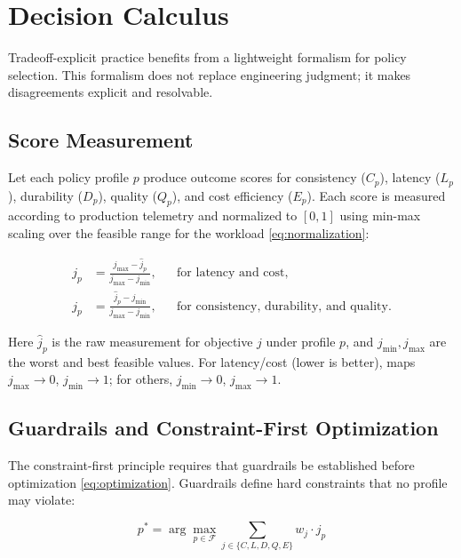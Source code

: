 \documentclass[conference]{IEEEtran}
\begin{document}
{\section{Decision Calculus}
\label{sec:calculus}

Tradeoff-explicit practice benefits from a lightweight formalism for policy selection. This formalism does not replace engineering judgment; it makes disagreements explicit and resolvable.

{\color{red}
\subsection{Score Measurement}

Let each policy profile $p$ produce outcome scores for consistency ($C_p$), latency ($L_p$), durability ($D_p$), quality ($Q_p$), and cost efficiency ($E_p$). Each score is measured according to production telemetry and normalized to $[0, 1]$ using min-max scaling over the feasible range for the workload \eqref{eq:normalization}:

\begin{equation}
\begin{aligned}
j_p &= \frac{j_{\max}-\hat{j}_p}{j_{\max}-j_{\min}},
&& \text{for latency and cost,} \\
j_p &= \frac{\hat{j}_p-j_{\min}}{j_{\max}-j_{\min}},
&& \text{for consistency, durability, and quality.}
\end{aligned}
\label{eq:normalization}
\end{equation}

Here $\hat{j}_p$ is the raw measurement for objective $j$ under profile $p$, and $j_{\text{min}}, j_{\text{max}}$ are the worst and best feasible values. For latency/cost (lower is better), maps $j_{\max} \to 0$, $j_{\min} \to 1$; for others, $j_{\min} \to 0$, $j_{\max} \to 1$.

\subsection{Guardrails and Constraint-First Optimization}

The constraint-first principle requires that guardrails be established before optimization \eqref{eq:optimization}. Guardrails define hard constraints that no profile may violate:

\begin{equation}
p^* = \arg\max_{p \in \mathcal{F}} \sum_{j \in \{C,L,D,Q,E\}} w_j \cdot j_p
\label{eq:optimization}
\end{equation}

}}
\end{document}
